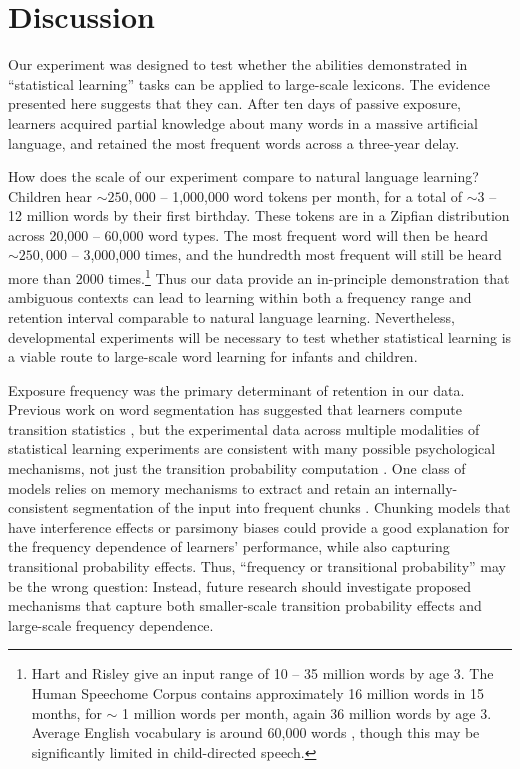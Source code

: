 \documentclass[10pt]{article}
\begin{document}
\section*{Discussion}

Our experiment was designed to test whether the abilities demonstrated in ``statistical learning'' tasks can be applied to large-scale lexicons. The evidence presented here suggests that they can. After ten days of passive exposure, learners acquired partial knowledge about many words in a massive artificial language, and retained the most frequent words across a three-year delay.

How does the scale of our experiment compare to natural language learning? Children hear $\sim250,000$ -- 1,000,000 word tokens per month, for a total of $\sim3$ -- 12 million words by their first birthday. These tokens are in a Zipfian distribution across 20,000 -- 60,000 word types. The most frequent word will then be heard $\sim250,000$ -- 3,000,000 times, and the hundredth most frequent will still be heard more than 2000 times.\footnote{Hart and Risley \cite{hart1995} give an input range of 10 -- 35 million words by age 3. The Human Speechome Corpus \cite{roy2009} contains approximately 16 million words in 15 months, for $\sim$ 1 million words per month, again 36 million words by age 3. Average English vocabulary is around 60,000 words \cite{pinker1994}, though this may be significantly limited in child-directed speech.} Thus our data provide an in-principle demonstration that ambiguous contexts can lead to learning within both a frequency range and retention interval comparable to natural language learning. Nevertheless, developmental experiments will be necessary to test whether statistical learning is a viable route to large-scale word learning for infants and children.

Exposure frequency was the primary determinant of retention in our data. Previous work on word segmentation has suggested that learners compute transition statistics \cite{saffran1996a, saffran1996b}, but the experimental data across multiple modalities of statistical learning experiments are consistent with many possible psychological mechanisms, not just the transition probability computation \cite{kurumada2011,frank2010,orban2008}. One class of models relies on memory mechanisms to extract and retain an internally-consistent segmentation of the input into frequent chunks \cite{perruchet1998,goldwater2009,french2011}. Chunking models that have interference effects or parsimony biases could provide a good explanation for the frequency dependence of learners' performance, while also capturing transitional probability effects. Thus, ``frequency or transitional probability'' may be the wrong question: Instead, future research should investigate proposed mechanisms that capture both smaller-scale transition probability effects and large-scale frequency dependence.  
\end{document}
